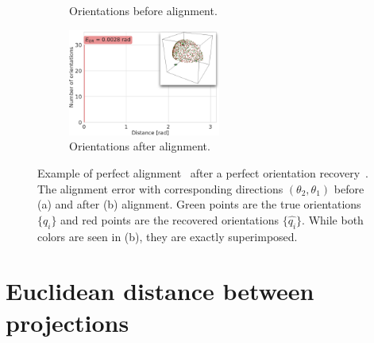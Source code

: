 \begin{figure}[ht!]
\begin{minipage}[t]{0.64\linewidth}
\begin{subfigure}[t]{0.48\linewidth}
            \caption{Orientations before alignment.}
        \end{subfigure}
        \hfill
        \begin{subfigure}[t]{0.48\linewidth}
            \centering
            \includegraphics[height=3.5cm]{figures/AfterAA.pdf}
            \caption{Orientations after alignment.}
        \end{subfigure}
        \caption{%
            Example of perfect alignment~ after a perfect orientation recovery~.
            The alignment error with corresponding directions $(\theta_2, \theta_1)$ before (a) and after (b) alignment.
            Green points are the true orientations $\{q_i\}$ and red points are the recovered orientations $\{\widehat{q_i}\}$.
            While both colors are seen in (b), they are exactly superimposed.
        }\label{fig:5j0n-aa-loss-perfect-distances}
    \end{minipage}
\end{figure}

\section{Euclidean distance between projections}\label{apx:results:distance-estimation}



